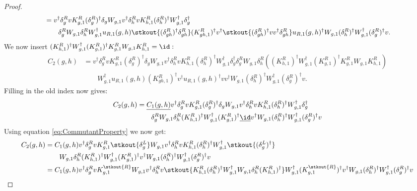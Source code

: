 \begin{proof}
\begin{align}
		&=v^\dagger \delta_g^R v K_{g,1}^R (\delta_g^R)^\dagger \delta_g W_{g,1}v^\dagger \delta_h^R v K_{h,1}^R (\delta_h^R)^\dagger W_{g,1}^\dagger \delta_g^\dagger\\
		\nonumber
		&\qquad \delta_g^R W_{g,1}\delta_h^R W_{g,1}^\dagger u_{R,1}(g,h)\stkout{(\delta_{gh}^R)^\dagger \delta_{gh}^R} (K_{gh,1}^R)^\dagger v^\dagger \stkout{(\delta_{gh}^R)^\dagger v  v^\dagger \delta^R_{gh}} u_{R,1}(g,h)^\dagger W_{g,1}(\delta^R_h)^\dagger W_{g,1}^\dagger(\delta_g^R)^\dagger v.
	\end{align}
	We now insert $(K_{h,1}^R)^\dagger W_{g,1}^\dagger (K_{g,1}^R)^\dagger K_{g,1}^R W_{g,1}K_{h,1}^R=\id:$
	\begin{align}
		\nonumber
		C_2(g,h)&=v^\dagger \delta_g^R v K_{g,1}^R (\delta_g^R)^\dagger \delta_g W_{g,1}v^\dagger \delta_h^R v K_{h,1}^R (\delta_h^R)^\dagger W_{g,1}^\dagger \delta_g^\dagger\delta_g^R W_{g,1}\delta_h^R \left((K_{h,1}^R)^\dagger W_{g,1}^\dagger (K_{g,1}^R)^\dagger K_{g,1}^R W_{g,1}K_{h,1}^R\right)\\	
		&\qquad  W_{g,1}^\dagger u_{R,1}(g,h) (K_{gh,1}^R)^\dagger v^\dagger u_{R,1}(g,h)^\dagger v v^\dagger W_{g,1}(\delta^R_h)^\dagger W_{g,1}^\dagger(\delta_g^R)^\dagger v.
	\end{align}
	Filling in the old index now gives:
	\begin{align}
		C_2(g,h)&=\underline{C_1(g,h)}v^\dagger \delta_g^R v K_{g,1}^R (\delta_g^R)^\dagger \delta_g W_{g,1}v^\dagger \delta_h^R v K_{h,1}^R (\delta_h^R)^\dagger W_{g,1}^\dagger \delta_g^\dagger\\
		\nonumber
		&\qquad \delta_g^R W_{g,1}\delta_h^R (K_{h,1}^R)^\dagger W_{g,1}^\dagger (K_{g,1}^R)^\dagger \underline{\id} v^\dagger W_{g,1}(\delta^R_h)^\dagger W_{g,1}^\dagger(\delta_g^R)^\dagger v
	\end{align}
	Using equation \eqref{eq:CommutantProperty} we now get:
	\begin{align}
		C_2(g,h)&=C_1(g,h)v^\dagger \delta_g^R v K_{g,1}^R \stkout{\delta_g^L} W_{g,1}v^\dagger \delta_h^R v K_{h,1}^R (\delta_h^R)^\dagger W_{g,1}^\dagger \stkout{(\delta_g^L)^\dagger}\\
		\nonumber
		&\qquad  W_{g,1}\delta_h^R (K_{h,1}^R)^\dagger W_{g,1}^\dagger (K_{g,1}^R)^\dagger v^\dagger W_{g,1}(\delta^R_h)^\dagger W_{g,1}^\dagger(\delta_g^R)^\dagger v\\
		\nonumber
		&=C_1(g,h)v^\dagger \delta_g^R v K_{g,1}^\stkout{R} W_{g,1}v^\dagger \delta_h^R v \stkout{K_{h,1}^R (\delta_h^R)^\dagger W_{g,1}^\dagger W_{g,1}\delta_h^R (K_{h,1}^R)^\dagger} W_{g,1}^\dagger (K_{g,1}^\stkout{R})^\dagger v^\dagger W_{g,1}(\delta^R_h)^\dagger W_{g,1}^\dagger(\delta_g^R)^\dagger v\\

\end{align}
\end{proof}
